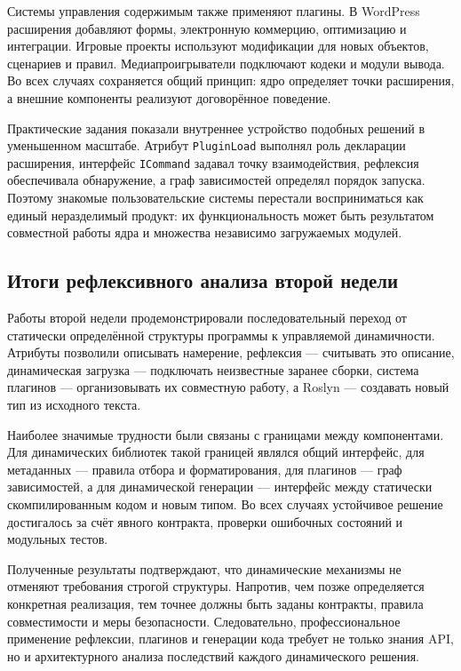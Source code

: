Системы управления содержимым также применяют плагины. В WordPress расширения добавляют формы, электронную коммерцию, оптимизацию и интеграции. Игровые проекты используют модификации для новых объектов, сценариев и правил. Медиапроигрыватели подключают кодеки и модули вывода. Во всех случаях сохраняется общий принцип: ядро определяет точки расширения, а внешние компоненты реализуют договорённое поведение.

Практические задания показали внутреннее устройство подобных решений в уменьшенном масштабе. Атрибут \texttt{PluginLoad} выполнял роль декларации расширения, интерфейс \texttt{ICommand} задавал точку взаимодействия, рефлексия обеспечивала обнаружение, а граф зависимостей определял порядок запуска. Поэтому знакомые пользовательские системы перестали восприниматься как единый неразделимый продукт: их функциональность может быть результатом совместной работы ядра и множества независимо загружаемых модулей.

\subsection{Итоги рефлексивного анализа второй недели}

Работы второй недели продемонстрировали последовательный переход от статически определённой структуры программы к управляемой динамичности. Атрибуты позволили описывать намерение, рефлексия --- считывать это описание, динамическая загрузка --- подключать неизвестные заранее сборки, система плагинов --- организовывать их совместную работу, а Roslyn --- создавать новый тип из исходного текста.

Наиболее значимые трудности были связаны с границами между компонентами. Для динамических библиотек такой границей являлся общий интерфейс, для метаданных --- правила отбора и форматирования, для плагинов --- граф зависимостей, а для динамической генерации --- интерфейс между статически скомпилированным кодом и новым типом. Во всех случаях устойчивое решение достигалось за счёт явного контракта, проверки ошибочных состояний и модульных тестов.

Полученные результаты подтверждают, что динамические механизмы не отменяют требования строгой структуры. Напротив, чем позже определяется конкретная реализация, тем точнее должны быть заданы контракты, правила совместимости и меры безопасности. Следовательно, профессиональное применение рефлексии, плагинов и генерации кода требует не только знания API, но и архитектурного анализа последствий каждого динамического решения.
